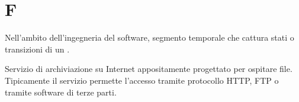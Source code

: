 \section{F}

Nell’ambito dell’ingegneria del software, segmento temporale che cattura stati o transizioni di un .

Servizio di archiviazione su Internet appositamente progettato per ospitare file. Tipicamente il servizio permette l'accesso tramite protocollo HTTP, FTP o tramite software di terze parti.